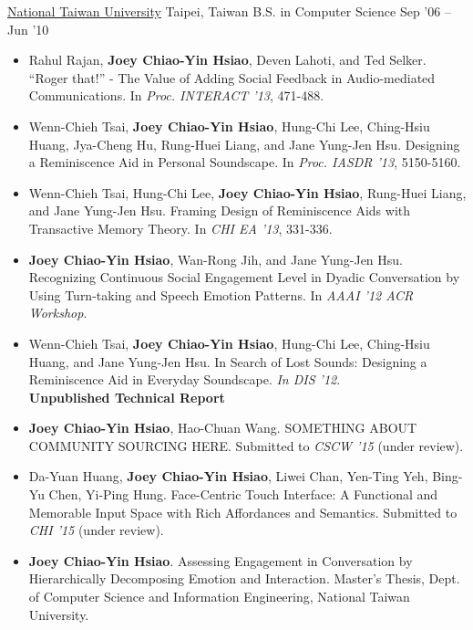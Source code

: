 \documentclass[10pt, a4paper]{article} %
\begin{document}
\headedsection %
{\href{http://www.ntu.edu.tw}{National Taiwan University}}
{Taipei, Taiwan}
{\headedsubsection %
	{B.S. in Computer Science}
	{Sep '06 -- Jun '10} 
	{\bodytext{}}
}

\spacedhrule{0.5em}{-1em} %



\begin{itemize}

\itemsep=0pt

\item Rahul Rajan, \textbf{Joey Chiao-Yin Hsiao}, Deven Lahoti, and Ted Selker. 
``Roger that!'' - The Value of Adding Social Feedback in Audio-mediated Communications. 
In \textit{Proc. INTERACT '13}, 471-488.
\item Wenn-Chieh Tsai, \textbf{Joey Chiao-Yin Hsiao}, Hung-Chi Lee, Ching-Hsiu Huang, Jya-Cheng Hu, Rung-Huei Liang, and Jane Yung-Jen Hsu. 
Designing a Reminiscence Aid in Personal Soundscape. 
In \textit{Proc. IASDR '13}, 5150-5160.
\item Wenn-Chieh Tsai, Hung-Chi Lee, \textbf{Joey Chiao-Yin Hsiao}, Rung-Huei Liang, and Jane Yung-Jen Hsu. 
Framing Design of Reminiscence Aids with Transactive Memory Theory. 
In \textit{CHI EA '13}, 331-336.
\item \textbf{Joey Chiao-Yin Hsiao}, Wan-Rong Jih, and Jane Yung-Jen Hsu. 
Recognizing Continuous Social Engagement Level in Dyadic Conversation by Using Turn-taking and Speech Emotion Patterns. 
In \textit{AAAI '12 ACR Workshop}.
\item Wenn-Chieh Tsai, \textbf{Joey Chiao-Yin Hsiao}, Hung-Chi Lee, Ching-Hsiu Huang, and Jane Yung-Jen Hsu. 
In Search of Lost Sounds: Designing a Reminiscence Aid in Everyday Soundscape. 
\textit{In DIS '12}. \\

\textbf{Unpublished Technical Report}
\item \textbf{Joey Chiao-Yin Hsiao}, Hao-Chuan Wang. SOMETHING ABOUT COMMUNITY SOURCING HERE. Submitted to \textit{CSCW '15} (under review).
\item Da-Yuan Huang, \textbf{Joey Chiao-Yin Hsiao}, Liwei Chan, Yen-Ting Yeh, Bing-Yu Chen, Yi-Ping Hung.
Face-Centric Touch Interface: A Functional and Memorable Input Space with Rich
Affordances and Semantics. Submitted to \textit{CHI '15} (under review).
\item \textbf{Joey Chiao-Yin Hsiao}. Assessing Engagement in Conversation by Hierarchically Decomposing Emotion and Interaction. 
Master's Thesis, Dept. of Computer Science and Information Engineering, National Taiwan University.

\end{itemize}
\end{document}
